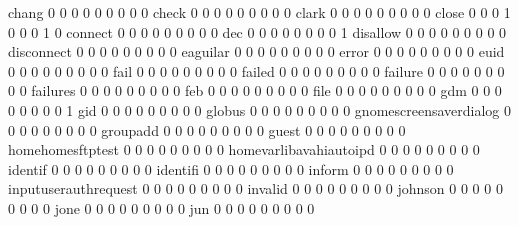 \documentclass[compress,8pt]{beamer}
\begin{document}
\begin{frame}
\begin{Schunk}
  chang                                      0   0   0   0   0   0   0   0   0
  check                                      0   0   0   0   0   0   0   0   0
  clark                                      0   0   0   0   0   0   0   0   0
  close                                      0   0   0   1   0   0   0   1   0
  connect                                    0   0   0   0   0   0   0   0   0
  dec                                        0   0   0   0   0   0   0   0   1
  disallow                                   0   0   0   0   0   0   0   0   0
  disconnect                                 0   0   0   0   0   0   0   0   0
  eaguilar                                   0   0   0   0   0   0   0   0   0
  error                                      0   0   0   0   0   0   0   0   0
  euid                                       0   0   0   0   0   0   0   0   0
  fail                                       0   0   0   0   0   0   0   0   0
  failed                                     0   0   0   0   0   0   0   0   0
  failure                                    0   0   0   0   0   0   0   0   0
  failures                                   0   0   0   0   0   0   0   0   0
  feb                                        0   0   0   0   0   0   0   0   0
  file                                       0   0   0   0   0   0   0   0   0
  gdm                                        0   0   0   0   0   0   0   0   1
  gid                                        0   0   0   0   0   0   0   0   0
  globus                                     0   0   0   0   0   0   0   0   0
  gnomescreensaverdialog                     0   0   0   0   0   0   0   0   0
  groupadd                                   0   0   0   0   0   0   0   0   0
  guest                                      0   0   0   0   0   0   0   0   0
  homehomesftptest                           0   0   0   0   0   0   0   0   0
  homevarlibavahiautoipd                     0   0   0   0   0   0   0   0   0
  identif                                    0   0   0   0   0   0   0   0   0
  identifi                                   0   0   0   0   0   0   0   0   0
  inform                                     0   0   0   0   0   0   0   0   0
  inputuserauthrequest                       0   0   0   0   0   0   0   0   0
  invalid                                    0   0   0   0   0   0   0   0   0
  johnson                                    0   0   0   0   0   0   0   0   0
  jone                                       0   0   0   0   0   0   0   0   0
  jun                                        0   0   0   0   0   0   0   0   0

\end{Schunk}
\end{frame}
\end{document}

